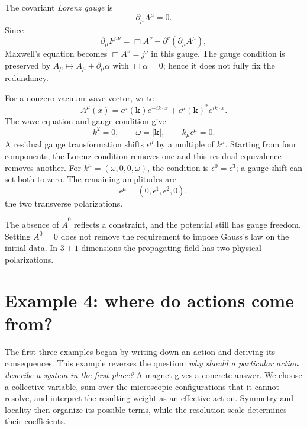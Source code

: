 \documentclass[11pt]{article}
\begin{document}
The covariant \emph{Lorenz gauge} is
\begin{equation}
\partial_\mu A^\mu=0.
\label{eq:Lorenz}
\end{equation}
Since
\begin{equation}
\partial_\mu F^{\mu\nu}
=\Box A^\nu-\partial^\nu(\partial_\mu A^\mu),
\end{equation}
Maxwell's equation becomes \(\Box A^\nu=j^\nu\) in this gauge. The gauge
condition is preserved by \(A_\mu\mapsto A_\mu+\partial_\mu\alpha\) with
\(\Box\alpha=0\); hence it does not fully fix the redundancy.

For a nonzero vacuum wave vector, write
\begin{equation}
A^\mu(x)=\epsilon^\mu(\bm k)e^{-ik\cdot x}
+\epsilon^\mu(\bm k)^*e^{ik\cdot x}.
\end{equation}
The wave equation and gauge condition give
\begin{equation}
k^2=0,\qquad \omega=|\bm k|,\qquad k_\mu\epsilon^\mu=0.
\end{equation}
A residual gauge transformation shifts \(\epsilon^\mu\) by a multiple of
\(k^\mu\). Starting from four components, the Lorenz condition removes one
and this residual equivalence removes another. For
\(k^\mu=(\omega,0,0,\omega)\), the condition is
\(\epsilon^0=\epsilon^3\); a gauge shift can set both to zero. The remaining
amplitudes are
\begin{equation}
\epsilon^\mu=(0,\epsilon^1,\epsilon^2,0),
\end{equation}
the two transverse polarizations.

\begin{keyidea}
The absence of \(\dot A^0\) reflects a constraint, and the potential still
has gauge freedom. Setting \(A^0=0\) does not remove the requirement to impose
Gauss's law on the initial data. In \(3+1\) dimensions the propagating field
has two physical polarizations.
\end{keyidea}

\section{Example 4: where do actions come from?}
\label{sec:Landau}

The first three examples began by writing down an action and deriving its
consequences. This example reverses the question: \emph{why should a
particular action describe a system in the first place?} A magnet gives a
concrete answer. We choose a collective variable, sum over the microscopic
configurations that it cannot resolve, and interpret the resulting weight
as an effective action. Symmetry and locality then organize its possible
terms, while the resolution scale determines their coefficients.
\end{document}
